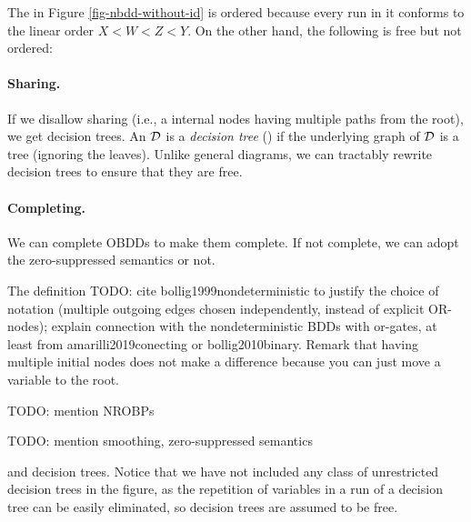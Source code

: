 \begin{example}
The \nbdd in Figure \ref{fig-nbdd-without-id} is ordered because every run in it conforms to the linear order $X < W < Z < Y$. On the other hand, the following \nbdd is free but not ordered:

\end{example}

\begin{center}

\end{center}

\paragraph*{Sharing.}
If we disallow sharing (i.e., a internal nodes having multiple paths from the root), we get decision trees.
An \nbdd $\mathcal{D}$ is a \emph{decision tree} (\ndt) if the underlying graph of $\mathcal{D}$ is a tree (ignoring the leaves).
Unlike general diagrams, we can tractably rewrite decision trees to ensure that they are free.

\paragraph*{Completing.}
We can complete OBDDs to make them complete. If not complete, we can adopt the zero-suppressed semantics or not.

The definition 
TODO: cite bollig1999nondeterministic to justify the choice of notation (multiple outgoing edges chosen independently, instead of explicit OR-nodes); explain connection with the nondeterministic BDDs with or-gates, at least from amarilli2019conecting or bollig2010binary. Remark that having multiple initial nodes does not make a difference because you can just move a variable to the root.

TODO: mention NROBPs

TODO: mention smoothing, zero-suppressed semantics

and decision trees. Notice that we have not included any class of unrestricted decision trees in the figure, as the repetition of variables in a run of a decision tree can be easily eliminated, so decision trees are assumed to be free.
